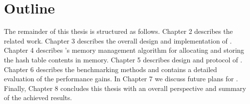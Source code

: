 \section{Outline}

The remainder of this thesis is structured as follows. Chapter 2 describes the related work. Chapter 3 
describes the overall design and implementation of \cphash{}. Chapter 4 describes \cphash{}'s memory management 
algorithm for allocating and storing the hash table contents in memory. Chapter 5 describes design and protocol of \cpserver{}.
Chapter 6 describes the benchmarking methods and contains a detailed evaluation of the performance gains. In Chapter 7 we discuss future plans for \cphash{}. 
Finally, Chapter 8 concludes this thesis with an overall perspective and summary of the achieved results. 

